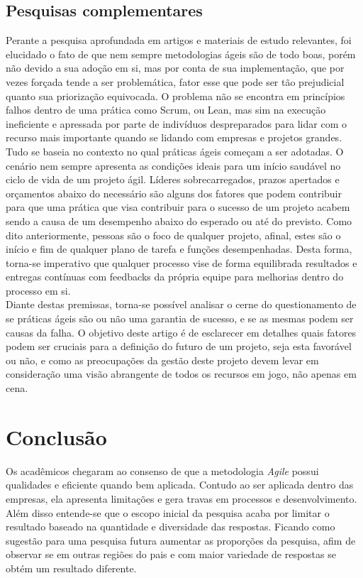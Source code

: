 \documentclass[12pt]{article}
\begin{document}
\subsection{Pesquisas complementares}
Perante a pesquisa aprofundada em artigos e materiais de estudo relevantes, foi elucidado o fato de que nem sempre metodologias ágeis são de todo boas, porém não devido a sua adoção em si, mas por conta de sua implementação, que por vezes forçada tende a ser problemática, fator esse que pode ser tão prejudicial quanto sua priorização equivocada. O problema não se encontra em princípios falhos dentro de uma prática como Scrum, ou Lean, mas sim na execução
ineficiente e apressada por parte de indivíduos despreparados para lidar com o recurso mais importante quando se lidando com empresas e projetos grandes.
\\Tudo se baseia no contexto no qual práticas ágeis começam a ser adotadas. O
cenário nem sempre apresenta as condições ideais para um início saudável no ciclo de vida de um projeto ágil. Líderes sobrecarregados, prazos apertados e orçamentos abaixo do necessário são alguns dos fatores que podem contribuir para que uma prática que visa contribuir para o sucesso de um projeto acabem sendo a causa de um desempenho abaixo do esperado ou até do previsto. Como dito anteriormente, pessoas são o foco de qualquer projeto, afinal, estes são o início e fim de qualquer plano de tarefa e funções desempenhadas. Desta forma, torna-se imperativo que qualquer processo vise de forma equilibrada resultados e entregas contínuas com feedbacks da própria equipe para melhorias dentro do processo em si.
\\Diante destas premissas, torna-se possível analisar o cerne do questionamento de se práticas ágeis são ou não uma garantia de sucesso, e se as mesmas podem ser causas da falha. O objetivo deste artigo é de esclarecer em detalhes quais fatores podem ser cruciais para a definição do futuro de um projeto, seja esta favorável ou não, e como as preocupações da gestão deste projeto devem levar em consideração uma visão abrangente de todos os recursos em jogo, não apenas em cena.
\section{Conclusão}
Os acadêmicos chegaram ao consenso de que a metodologia \textit{Agile} possui qualidades e eficiente quando bem aplicada. Contudo ao ser aplicada dentro das empresas, ela apresenta limitações e gera travas em processos e desenvolvimento.
\\Além disso entende-se que o escopo inicial da pesquisa acaba por limitar o resultado baseado na quantidade e diversidade das respostas. Ficando como sugestão para uma pesquisa futura aumentar as proporções da pesquisa, afim de observar se em outras regiões do pais e com maior variedade de respostas se obtém um resultado diferente.



\nocite{*}
\end{document}
